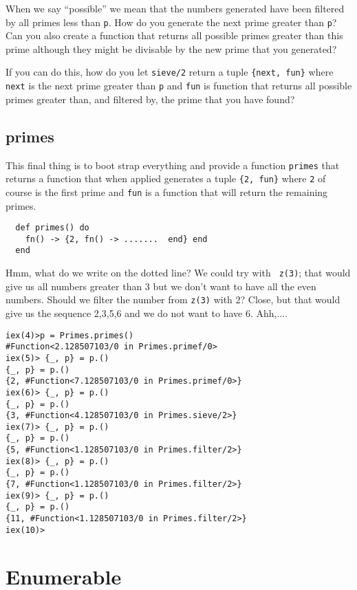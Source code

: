 \documentclass[a4paper,11pt]{article}
\begin{document}
When we say ``possible'' we mean that the numbers generated have been
filtered by all primes less than {\tt p}. How do you generate the next
prime greater than {\tt p}? Can you also create a function that
returns all possible primes greater than this prime although they
might be divisable by the new prime that you generated?

If you can do this, how do you let {\tt sieve/2} return a tuple
{\tt \{next, fun\}} where {\tt next} is the next prime greater than
{\tt p} and {\tt fun} is function that returns all possible primes
  greater than, and filtered by, the prime that you have found?

\subsection*{primes}

This final thing is to boot strap everything and provide a function
{\tt primes} that returns a function that when applied generates a
tuple {\tt \{2, fun\}} where {\tt 2} of course is the first prime and
{\tt fun} is a function that will return the remaining primes.

\begin{verbatim}
  def primes() do
    fn() -> {2, fn() -> .......  end} end
  end
\end{verbatim}

Hmm, what do we write on the dotted line? We could try with {\tt
  z(3)}; that would give us all numbers greater than 3 but we don't
want to have all the even numbers. Should we filter the number from
{\tt z(3)} with 2? Close, but that would give us the sequence 2,3,5,6
and we do not want to have 6. Ahh,....

\begin{verbatim}
iex(4)>p = Primes.primes()
#Function<2.128507103/0 in Primes.primef/0>
iex(5)> {_, p} = p.()
{_, p} = p.()
{2, #Function<7.128507103/0 in Primes.primef/0>}
iex(6)> {_, p} = p.()
{_, p} = p.()
{3, #Function<4.128507103/0 in Primes.sieve/2>}
iex(7)> {_, p} = p.()
{_, p} = p.()
{5, #Function<1.128507103/0 in Primes.filter/2>}
iex(8)> {_, p} = p.()
{_, p} = p.()
{7, #Function<1.128507103/0 in Primes.filter/2>}
iex(9)> {_, p} = p.()
{_, p} = p.()
{11, #Function<1.128507103/0 in Primes.filter/2>}
iex(10)>
\end{verbatim}


\section*{Enumerable}
\end{document}
